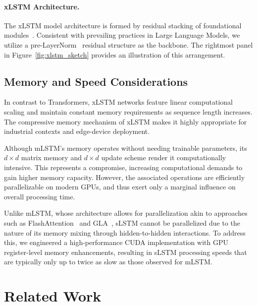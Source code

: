 \paragraph{xLSTM Architecture. }
\label{sec:xLSTMarchitecure}
The xLSTM model architecture is formed by residual stacking of foundational modules~\citep{Srivastava:15,He:16}. Consistent with prevailing practices in Large Language Models, we utilize a pre-LayerNorm~\citep{Ba:16b} residual structure as the backbone. The rightmost panel in Figure~\ref{fig:xlstm_sketch} provides an illustration of this arrangement.

\subsection{Memory and Speed Considerations}

In contrast to Transformers, xLSTM networks feature linear computational scaling and maintain constant memory requirements as sequence length increases. The compressive memory mechanism of xLSTM makes it highly appropriate for industrial contexts and edge-device deployment.

Although mLSTM’s memory operates without needing trainable parameters, its $d \times d$ matrix memory and $d \times d$ update scheme render it computationally intensive. This represents a compromise, increasing computational demands to gain higher memory capacity. However, the associated operations are efficiently parallelizable on modern GPUs, and thus exert only a marginal influence on overall processing time.

Unlike mLSTM, whose architecture allows for parallelization akin to approaches such as FlashAttention~\citep{Dao:22,Dao:23} and GLA~\citep{Yang:23arxiv}, sLSTM cannot be parallelized due to the nature of its memory mixing through hidden-to-hidden interactions. To address this, we engineered a high-performance CUDA implementation with GPU register-level memory enhancements, resulting in sLSTM processing speeds that are typically only up to twice as slow as those observed for mLSTM.

\section{Related Work}
\label{sec:related}

